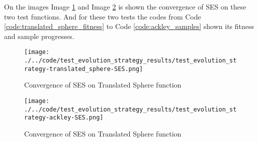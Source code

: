 On the images Image \ref{img:test_evolution_strategy-translated_sphere-SES} and Image \ref{img:test_evolution_strategy-ackley-SES} is shown the convergence of SES on these two test functions. And for these two tests the codes from Code \ref{code:translated_sphere_fitness} to Code \ref{code:ackley_samples} shown its fitness and sample progresses.

\begin{figure}
  \begin{center}
  \texttt{[image: ./../code/test\_evolution\_strategy\_results/test\_evolution\_strategy-translated\_sphere-SES.png]}
  \caption{Convergence of SES on Translated Sphere function}
  \label{img:test_evolution_strategy-translated_sphere-SES}
  \end{center}
\end{figure}





\begin{figure}
  \begin{center}
  \texttt{[image: ./../code/test\_evolution\_strategy\_results/test\_evolution\_strategy-ackley-SES.png]}
  \caption{Convergence of SES on Translated Sphere function}
  \label{img:test_evolution_strategy-ackley-SES}
  \end{center}
\end{figure}





